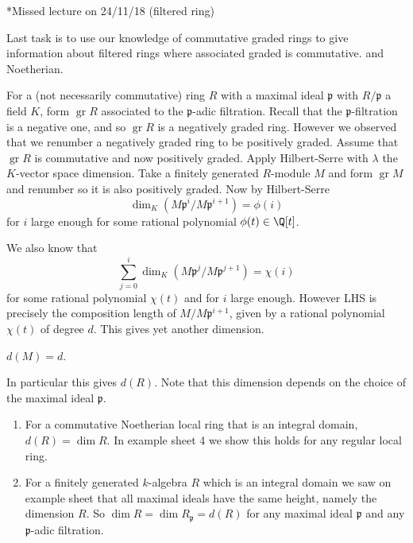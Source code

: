 \documentclass[a4paper]{article}
\DeclareMathOperator{\gr}{gr}
\begin{document}
*Missed lecture on 24/11/18 (filtered ring)

Last task is to use our knowledge of commutative graded rings to give information about filtered rings where associated graded is commutative. and Noetherian.

For a (not necessarily commutative) ring \(R\) with a maximal ideal \(\mathfrak p\) with \(R/\mathfrak p\) a field \(K\), form \(\gr R\) associated to the \(\mathfrak p\)-adic filtration. Recall that the \(\mathfrak p\)-filtration is a negative one, and so \(\gr R\) is a negatively graded ring. However we observed that we renumber a negatively graded ring to be positively graded. Assume that \(\gr R\) is commutative and now positively graded. Apply Hilbert-Serre with \(\lambda\) the \(K\)-vector space dimension. Take a finitely generated \(R\)-module \(M\) and form \(\gr M\) and renumber so it is also positively graded. Now by Hilbert-Serre
\[
  \dim_K(M \mathfrak p^i/M \mathfrak p^{i + 1}) = \phi(i)
\]
for \(i\) large enough for some rational polynomial \(\phi(t) \in \Q[t]\).

We also know that
\[
  \sum_{j = 0}^i \dim_K (M \mathfrak p^j/M \mathfrak p^{j + 1}) = \chi(i)
\]
for some rational polynomial \(\chi(t)\) and for \(i\) large enough. However LHS is precisely the composition length of \(M /M \mathfrak p^{i + 1}\), given by a rational polynomial \(\chi(t)\) of degree \(d\). This gives yet another dimension.

\begin{definition}
  \(d(M) = d\).
\end{definition}

In particular this gives \(d(R)\). Note that this dimension depends on the choice of the maximal ideal \(\mathfrak p\).

\begin{remark}\leavevmode
  \begin{enumerate}
  \item For a commutative Noetherian local ring that is an integral domain, \(d(R) = \dim R\). In example sheet 4 we show this holds for any regular local ring.
  \item For a finitely generated \(k\)-algebra \(R\) which is an integral domain we saw on example sheet that all maximal ideals have the same height, namely the dimension \(R\). So \(\dim R = \dim R_{\mathfrak p} = d(R)\) for any maximal ideal \(\mathfrak p\) and any \(\mathfrak p\)-adic filtration.
  \end{enumerate}
\end{remark}
\end{document}

